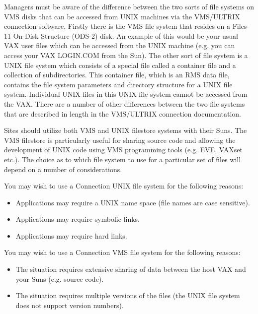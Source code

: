 Managers must be aware of the difference between the two sorts of file
systems on VMS disks that can be accessed from UNIX machines via the
VMS/ULTRIX connection software. Firstly there is the VMS file system that
resides on a Files-11 On-Disk Structure (ODS-2) disk. An example of this
would be your usual VAX user files which can be accessed from the UNIX
machine (e.g. you can access your VAX LOGIN.COM from the Sun). The other sort
of file system is a UNIX file system which consists of a special
file called a container file and a collection of subdirectories. This container
file, which is an RMS data file, contains the file system parameters and
directory structure for a UNIX file system. Individual UNIX files in this UNIX
file system cannot be accessed from the VAX. There are a number of other
differences between the two file systems that are described in length in the
VMS/ULTRIX connection  documentation.

Sites should utilize both VMS and UNIX filestore systems with their Suns.
The VMS filestore is particularly useful for sharing source code and
allowing the development of UNIX code using VMS programming tools
(e.g. EVE, VAXset etc.). The choice as to which file system to use for
a particular set of files will depend on a number of considerations.

You may wish to use a Connection UNIX file system for the following reasons:

\begin{itemize}

\item Applications may require a UNIX name space (file names are case
sensitive).

\item Applications may require symbolic links.

\item Applications may require hard links.

\end{itemize}

You may wish to use a Connection VMS file system for the following reasons:

\begin{itemize}

\item The situation requires extensive sharing of data between the host VAX and
your Suns (e.g. source code).

\item The situation requires multiple versions of the files (the UNIX file system
does not support version numbers).

\end{itemize}

